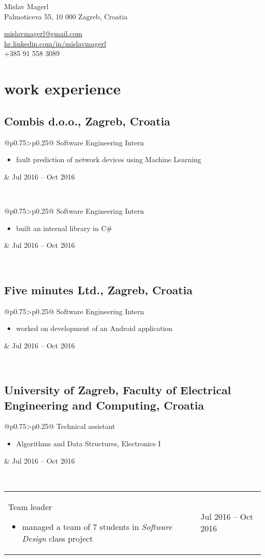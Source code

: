 \documentclass[a4paper]{article}
\makeatletter
\newlength{\tablewidth}
\newenvironment{period}[2]{%
\newcommand{\sarma}{#2}%
\setlength{\tablewidth}{\linewidth}
\addtolength{\tablewidth}{-2\tabcolsep}
\begin{tabular}{@{}p{0.75\tablewidth}>{\raggedleft\arraybackslash}p{0.25\tablewidth}@{}}%
#1 \newline
\begin{itemize}
}{%
\end{itemize} & \sarma \\%
\end{tabular}\\
}
\makeatother
\begin{document}
\fontfamily{\sfdefault}
\selectfont

\begin{minipage}{.5\textwidth}
\LARGE{Mislav Magerl}\\
\normalsize{Palmoticeva 55, 10 000 Zagreb, Croatia}
\end{minipage}%
\begin{minipage}{.5\textwidth}
\raggedleft
\href{mailto:mislavmagerl@gmail.com}{mislavmagerl@gmail.com} \\
\href{https://hr.linkedin.com/in/mislavmagerl}{hr.linkedin.com/in/mislavmagerl} \\
+385 91 558 3089
\end{minipage}

\vspace{1em}

\section{work experience}
\subsection{Combis d.o.o., Zagreb, Croatia}
\begin{period}{Software Engineering Intern}{Jul 2016 -- Oct 2016}
    \item 
        fault prediction of network devices using Machine Learning
\end{period}
\begin{period}{Software Engineering Intern}{Jan 2016 -- Feb 2016}
    \item 
        built an internal library in C\#
\end{period}
\subsection{Five minutes Ltd., Zagreb, Croatia}
\begin{period}{Software Engineering Intern}{Jul 2015 -- Aug 2015}
    \item 
        worked on development of an Android application
\end{period}

\subsection{University of Zagreb, Faculty of Electrical Engineering and Computing, Croatia}
\begin{period}{Technical assistant}{Mar 2013 -- Jan 2014}
    \item Algorithms and Data Structures, Electronics I
\end{period}
\begin{period}{Team leader}{Sep 2014 -- Jan 2015}
    \item managed a team of 7 students in \textit{Software Design} class project
\end{period}
\end{document}
